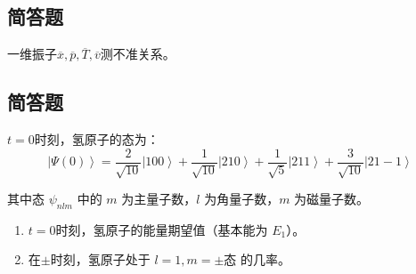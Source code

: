 \subsection{简答题}
一维振子$\overline{x},\overline{p},\overline{T},\overline{v}$测不准关系。
\subsection{简答题}
$t=0$时刻，氢原子的态为：
\[
\left| \Psi(0) \right\rangle = \frac{2}{\sqrt{10}} \left| 100 \right\rangle + \frac{1}{\sqrt{10}} \left| 210 \right\rangle + \frac{1}{\sqrt{5}} \left| 211 \right\rangle + \frac{3}{\sqrt{10}} \left| 21-1 \right\rangle~
\]


其中态 $\psi_{nlm}$ 中的 $m$ 为主量子数，$l$ 为角量子数，$m$ 为磁量子数。

\begin{enumerate}
    \item $t=0$时刻，氢原子的能量期望值（基本能为 $E_1$）。
    \item 在$\pm$时刻，氢原子处于 $l=1, m=\pm$态 的几率。
\end{enumerate}